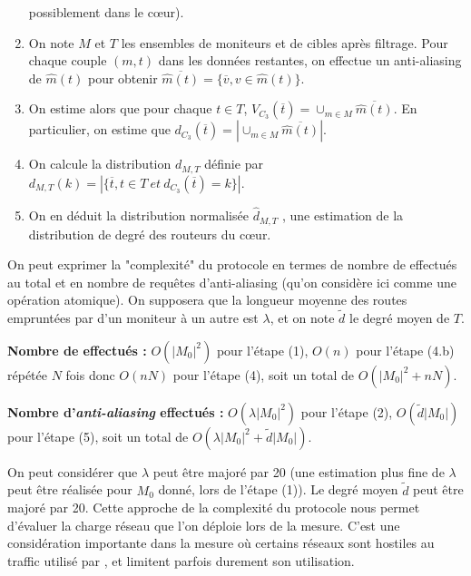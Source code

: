 \begin{enumerate}
possiblement dans le c\oe{}ur).
\item On note $M$ et $T$ les ensembles de moniteurs et de cibles après filtrage.
Pour chaque couple $(m, t)$ dans les données restantes, on effectue un
anti-aliasing de $\hat{m}(t)$ pour obtenir $\overline{\hat{m}(t)}
= \{ \overline{v}, v \in \hat{m}(t) \}$.
\item On estime alors que pour chaque $t \in T$, $V_{C_3}(\overline{t}) =
\cup_{m \in M} \overline{\hat{m}(t)}$. En particulier, on estime que
$d_{C_3}(\overline{t}) = |\cup_{m \in M} \overline{\hat{m}(t)}|$.
\item On calcule la distribution $d_{M,T}$ définie par $d_{M,T}(k) = |\{
\overline{t}, t \in T~et~d_{C_3}(\overline{t}) = k \}|$.
\item On en déduit la distribution normalisée $\hat{d}_{M,T}$ , une estimation
de la distribution de degré des routeurs du c\oe{}ur.
\end{enumerate}

On peut exprimer la "complexité" du protocole en termes de nombre de \traceroute
effectués au total et en nombre de requêtes d'anti-aliasing (qu'on considère
ici comme une opération atomique). On supposera que la longueur moyenne des
routes empruntées par \traceroute d'un moniteur à un autre est $\lambda$, et on
note $\tilde{d}$ le degré moyen de $T$.

\begin{bulletpoints}
\item {\bf Nombre de \traceroute effectués :} $O(|M_0|^2)$ pour l'étape (1),
$O(n)$ pour l'étape (4.b) répétée $N$ fois donc $O(n N)$ pour l'étape (4), soit
un total de \boldmath$O(|M_0|^2 + n N)$\unboldmath.
\item {\bf Nombre d'{\em anti-aliasing} effectués :} $O(\lambda|M_0|^2)$ pour
l'étape (2),  $O(\tilde{d} |M_0|)$ pour l'étape (5), soit un total
de \boldmath$O(\lambda |M_0|^2 + \tilde{d} |M_0|)$\unboldmath.
\end{bulletpoints}


On peut considérer que $\lambda$ peut être majoré par 20 (une estimation plus
fine de $\lambda$ peut être réalisée pour $M_0$ donné, lors de l'étape (1)). Le
degré moyen $\tilde{d}$ peut être majoré par 20. Cette approche de la complexité
du protocole nous permet d'évaluer la charge réseau que l'on déploie lors de la
mesure. C'est une considération importante dans la mesure où certains réseaux
sont hostiles au traffic \icmp utilisé par \traceroute, et limitent parfois
durement son utilisation.

